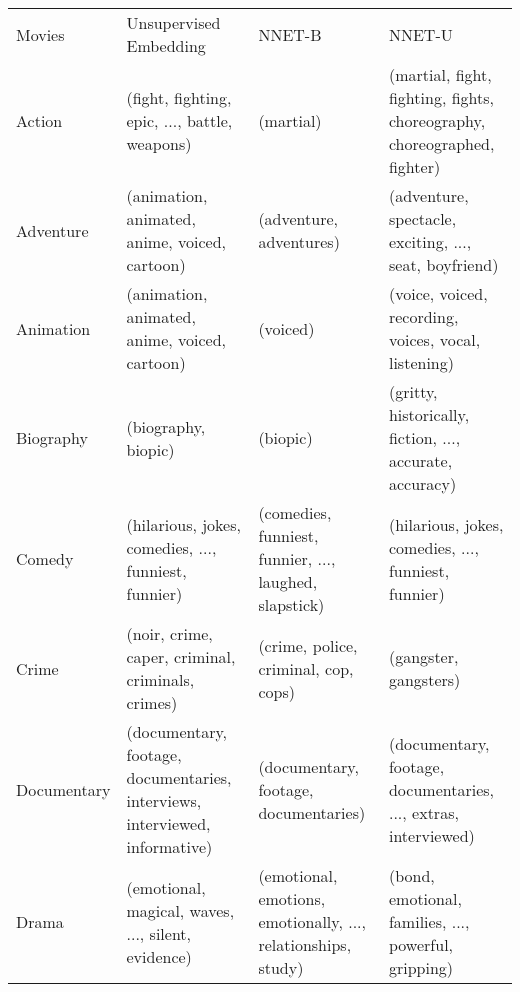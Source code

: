 \begin{landscape}
	
	\begin{table}[]
		\scriptsize
		\centering
		\begin{tabular}{lp{7cm}p{7cm}p{7cm}}
			Movies      & Unsupervised Embedding                                                       & NNET-B                                                           & NNET-U                                                           \\
			Action      & (fight, fighting, epic, ..., battle, weapons)                                & (martial)                                                          & (martial, fight, fighting, fights, choreography, choreographed, fighter) \\
			Adventure   & (animation, animated, anime, voiced, cartoon)                                & (adventure, adventures)                                            & (adventure, spectacle, exciting, ..., seat, boyfriend)                   \\
			Animation   & (animation, animated, anime, voiced, cartoon)                                & (voiced)                                                           & (voice, voiced, recording, voices, vocal, listening)                     \\
			Biography   & (biography, biopic)                                                          & (biopic)                                                           & (gritty, historically, fiction, ..., accurate, accuracy)                 \\
			Comedy      & (hilarious, jokes, comedies, ..., funniest, funnier)                         & (comedies, funniest, funnier, ..., laughed, slapstick)             & (hilarious, jokes, comedies, ..., funniest, funnier)                     \\
			Crime       & (noir, crime, caper, criminal, criminals, crimes)                            & (crime, police, criminal, cop, cops)                               & (gangster, gangsters)                                                    \\
			Documentary & (documentary, footage, documentaries, interviews, interviewed, informative)  & (documentary, footage, documentaries)                              & (documentary, footage, documentaries, ..., extras, interviewed)          \\
			Drama       & (emotional, magical, waves, ..., silent, evidence)                           & (emotional, emotions, emotionally, ..., relationships, study)      & (bond, emotional, families, ..., powerful, gripping)                     \\

\end{tabular}
\end{table}
\end{landscape}
